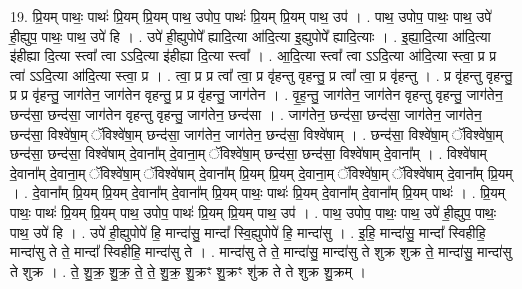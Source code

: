 \documentclass[17pt]{extarticle}
\begin{document}
19. प्रि॒यम् पाथः॒ पाथः॑ प्रि॒यम् प्रि॒यम् पाथ॒ उपोप॒ पाथः॑ प्रि॒यम् प्रि॒यम् पाथ॒ उप॑ । . पाथ॒ उपोप॒ पाथः॒ पाथ॒ उपे॑ ही॒ह्युप॒ पाथः॒ पाथ॒ उपे॑ हि । . उपे॑ ही॒ह्युपोपे᳚ ह्यादि॒त्या आ॑दि॒त्या इ॒ह्युपोपे᳚ ह्यादि॒त्याः । . इ॒ह्या॒दि॒त्या आ॑दि॒त्या इ॑हीह्या दि॒त्या स्त्वा᳚ त्वा ऽऽदि॒त्या इ॑हीह्या दि॒त्या स्त्वा᳚ । . आ॒दि॒त्या स्त्वा᳚ त्वा ऽऽदि॒त्या आ॑दि॒त्या स्त्वा॒ प्र प्र त्वा॑ ऽऽदि॒त्या आ॑दि॒त्या स्त्वा॒ प्र । . त्वा॒ प्र प्र त्वा᳚ त्वा॒ प्र वृ॑हन्तु वृहन्तु॒ प्र त्वा᳚ त्वा॒ प्र वृ॑हन्तु । . प्र वृ॑हन्तु वृहन्तु॒ प्र प्र वृ॑हन्तु॒ जाग॑तेन॒ जाग॑तेन वृहन्तु॒ प्र प्र वृ॑हन्तु॒ जाग॑तेन । . वृ॒ह॒न्तु॒ जाग॑तेन॒ जाग॑तेन वृहन्तु वृहन्तु॒ जाग॑तेन॒ छन्द॑सा॒ छन्द॑सा॒ जाग॑तेन वृहन्तु वृहन्तु॒ जाग॑तेन॒ छन्द॑सा । . जाग॑तेन॒ छन्द॑सा॒ छन्द॑सा॒ जाग॑तेन॒ जाग॑तेन॒ छन्द॑सा॒ विश्वे॑षा॒म् ॅविश्वे॑षा॒म् छन्द॑सा॒ जाग॑तेन॒ जाग॑तेन॒ छन्द॑सा॒ विश्वे॑षाम् । . छन्द॑सा॒ विश्वे॑षा॒म् ॅविश्वे॑षा॒म् छन्द॑सा॒ छन्द॑सा॒ विश्वे॑षाम् दे॒वाना᳚म् दे॒वाना॒म् ॅविश्वे॑षा॒म् छन्द॑सा॒ छन्द॑सा॒ विश्वे॑षाम् दे॒वाना᳚म् । . विश्वे॑षाम् दे॒वाना᳚म् दे॒वाना॒म् ॅविश्वे॑षा॒म् ॅविश्वे॑षाम् दे॒वाना᳚म् प्रि॒यम् प्रि॒यम् दे॒वाना॒म् ॅविश्वे॑षा॒म् ॅविश्वे॑षाम् दे॒वाना᳚म् प्रि॒यम् । . दे॒वाना᳚म् प्रि॒यम् प्रि॒यम् दे॒वाना᳚म् दे॒वाना᳚म् प्रि॒यम् पाथः॒ पाथः॑ प्रि॒यम् दे॒वाना᳚म् दे॒वाना᳚म् प्रि॒यम् पाथः॑ । . प्रि॒यम् पाथः॒ पाथः॑ प्रि॒यम् प्रि॒यम् पाथ॒ उपोप॒ पाथः॑ प्रि॒यम् प्रि॒यम् पाथ॒ उप॑ । . पाथ॒ उपोप॒ पाथः॒ पाथ॒ उपे॑ ही॒ह्युप॒ पाथः॒ पाथ॒ उपे॑ हि । . उपे॑ ही॒ह्युपोपे॑ हि॒ मान्दा॑सु॒ मान्दा᳚ स्वि॒ह्युपोपे॑ हि॒ मान्दा॑सु । . इ॒हि॒ मान्दा॑सु॒ मान्दा᳚ स्विहीहि॒ मान्दा॑सु ते ते॒ मान्दा᳚ स्विहीहि॒ मान्दा॑सु ते । . मान्दा॑सु ते ते॒ मान्दा॑सु॒ मान्दा॑सु ते शुक्र शुक्र ते॒ मान्दा॑सु॒ मान्दा॑सु ते शुक्र । . ते॒ शु॒क्र॒ शु॒क्र॒ ते॒ ते॒ शु॒क्र॒ शु॒क्रꣳ शु॒क्रꣳ शु॑क्र ते ते शुक्र शु॒क्रम् । \newline
\end{document}
